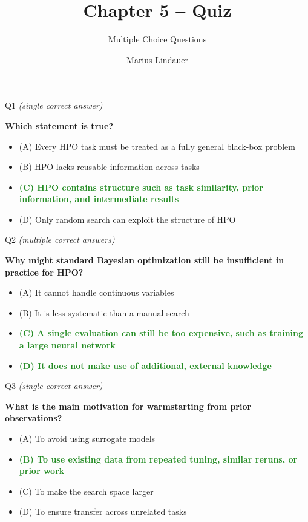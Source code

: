 \documentclass[main]{subfiles}
\title[Advanced HPO]{Chapter 5 -- Quiz}
\subtitle{Multiple Choice Questions}
\author[Marius Lindauer]{Marius Lindauer}
\date{}
\newcommand{\correct}[1]{\textcolor{ForestGreen}{\textbf{#1} \checkmark}}
\newcommand{\wrong}[1]{#1}
\begin{document}
    \maketitle

\begin{frame}{Q1 \hfill \small\normalfont\textit{(single correct answer)}}

\textbf{Which statement is true?}

\begin{itemize}
    \item \wrong{(A) \; Every HPO task must be treated as a fully general black-box problem}
    \item \wrong{(B) \; HPO lacks reusable information across tasks}
    \item \correct{(C) \; HPO contains structure such as task similarity, prior information, and intermediate results}
    \item \wrong{(D) \; Only random search can exploit the structure of HPO}
\end{itemize}

\end{frame}
\begin{frame}{Q2 \hfill \small\normalfont\textit{(multiple correct answers)}}

\textbf{Why might standard Bayesian optimization still be insufficient in practice for HPO?}

\begin{itemize}
    \item \wrong{(A) \; It cannot handle continuous variables}
    \item \wrong{(B) \; It is less systematic than a manual search}
    \item \correct{(C) \; A single evaluation can still be too expensive, such as training a large neural network}
    \item \correct{(D) \; It does not make use of additional, external knowledge}
\end{itemize}

\end{frame}
\begin{frame}{Q3 \hfill \small\normalfont\textit{(single correct answer)}}

\textbf{What is the main motivation for warmstarting from prior observations?}

\begin{itemize}
    \item \wrong{(A) \; To avoid using surrogate models}
    \item \correct{(B) \; To use existing data from repeated tuning, similar reruns, or prior work}
    \item \wrong{(C) \; To make the search space larger}
    \item \wrong{(D) \; To ensure transfer across unrelated tasks}
\end{itemize}

\end{frame}
\end{document}
